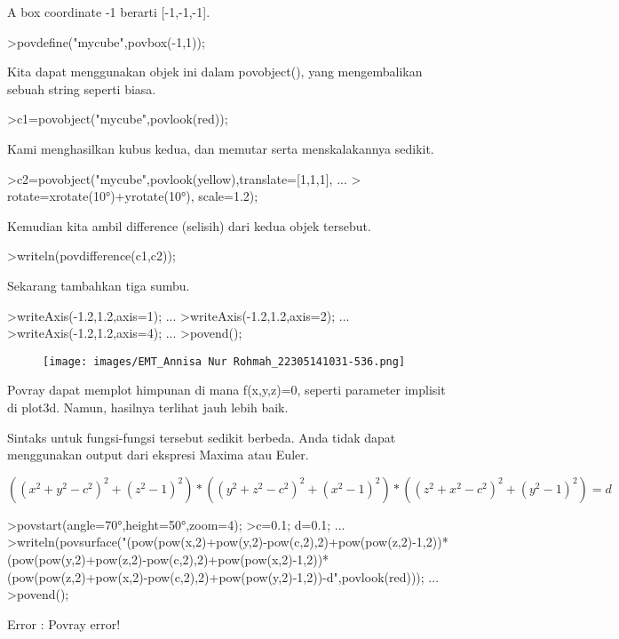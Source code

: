 \documentclass[a4paper,10pt]{article}
\begin{document}
\begin{eulernotebook}
\begin{eulercomment}
A box coordinate -1 berarti [-1,-1,-1].
\end{eulercomment}
\begin{eulerprompt}
>povdefine("mycube",povbox(-1,1));
\end{eulerprompt}
\begin{eulercomment}
Kita dapat menggunakan objek ini dalam povobject(), yang mengembalikan
sebuah string seperti biasa.
\end{eulercomment}
\begin{eulerprompt}
>c1=povobject("mycube",povlook(red));
\end{eulerprompt}
\begin{eulercomment}
Kami menghasilkan kubus kedua, dan memutar serta menskalakannya
sedikit.
\end{eulercomment}
\begin{eulerprompt}
>c2=povobject("mycube",povlook(yellow),translate=[1,1,1], ...
>  rotate=xrotate(10°)+yrotate(10°), scale=1.2);
\end{eulerprompt}
\begin{eulercomment}
Kemudian kita ambil difference (selisih) dari kedua objek tersebut.
\end{eulercomment}
\begin{eulerprompt}
>writeln(povdifference(c1,c2));
\end{eulerprompt}
\begin{eulercomment}
Sekarang tambahkan tiga sumbu.
\end{eulercomment}
\begin{eulerprompt}
>writeAxis(-1.2,1.2,axis=1); ...
>writeAxis(-1.2,1.2,axis=2); ...
>writeAxis(-1.2,1.2,axis=4); ...
>povend();
\end{eulerprompt}
\begin{figure}[h]
    \centering
    \texttt{[image: images/EMT\_Annisa Nur Rohmah\_22305141031-536.png]}
\end{figure}
\begin{eulercomment}
Povray dapat memplot himpunan di mana f(x,y,z)=0, seperti parameter
implisit di plot3d. Namun, hasilnya terlihat jauh lebih baik.

Sintaks untuk fungsi-fungsi tersebut sedikit berbeda. Anda tidak dapat
menggunakan output dari ekspresi Maxima atau Euler.

\end{eulercomment}
\begin{eulerformula}
\[
((x^2+y^2-c^2)^2+(z^2-1)^2)*((y^2+z^2-c^2)^2+(x^2-1)^2)*((z^2+x^2-c^2)^2+(y^2-1)^2)=d
\]
\end{eulerformula}
\begin{eulerprompt}
>povstart(angle=70°,height=50°,zoom=4);
>c=0.1; d=0.1; ...
>writeln(povsurface("(pow(pow(x,2)+pow(y,2)-pow(c,2),2)+pow(pow(z,2)-1,2))*(pow(pow(y,2)+pow(z,2)-pow(c,2),2)+pow(pow(x,2)-1,2))*(pow(pow(z,2)+pow(x,2)-pow(c,2),2)+pow(pow(y,2)-1,2))-d",povlook(red))); ...
>povend();
\end{eulerprompt}
\begin{euleroutput}
  Error : Povray error!
  

\end{euleroutput}
\end{eulernotebook}
\end{document}
